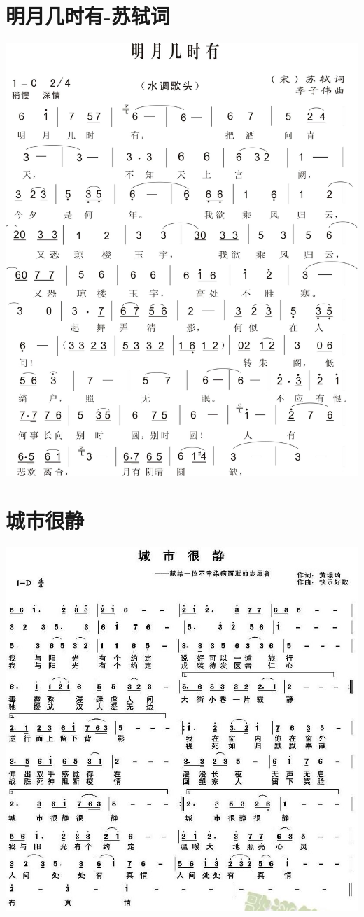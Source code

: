 \documentclass[cn,pad,chinesefont=nofont]{elegantbook}
\begin{document}
\section{明月几时有-苏轼词}
    \includegraphics[width=\textwidth]{dongxiao/20200411-明月几时有.jpg}
\section{城市很静}
    \includegraphics[width=\textwidth]{dongxiao/20200402-城市很静} 
\end{document}
